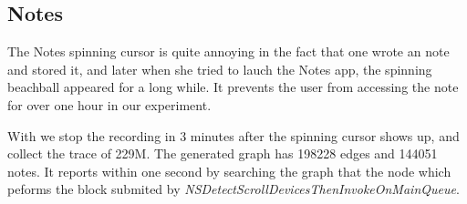 \subsection{Notes}
The Notes spinning cursor is quite annoying in the fact that one wrote an note
and stored it, and later when she tried to lauch the Notes app, the spinning
beachball appeared for a long while. It prevents the user from accessing the
note for over one hour in our experiment.

With \xxx we stop the recording in 3 minutes after the spinning
cursor shows up, and collect the trace of 229M.
The generated graph has 198228 edges and 144051 notes.
It reports within one second by searching the graph that
the node which peforms the block submited by
\textit{NSDetectScrollDevicesThenInvokeOnMainQueue}.

